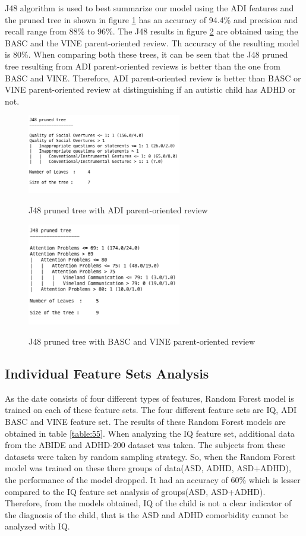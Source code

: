 J48 algorithm is used to best summarize our model using the ADI features and the pruned tree in shown in figure \ref{fig:51} has an accuracy of 94.4\% and precision and recall range from 88\% to 96\%. The J48 results in figure \ref{fig:52} are obtained using the BASC and the VINE parent-oriented review. Th accuracy of the resulting model is 80\%. When comparing both these trees, it can be seen that the J48 pruned tree resulting from ADI parent-oriented reviews is better than the one from BASC and VINE. Therefore, ADI parent-oriented review is better than BASC or VINE parent-oriented review at distinguishing if an autistic child has ADHD or not.
\begin{figure}
\centering
  {\includegraphics[width=0.6\textwidth]{Figures/Figure_5_1.png}}
  \caption{J48 pruned tree with ADI parent-oriented review}
  \label{fig:51}
\end{figure}

\begin{figure}
\centering
  {\includegraphics[width=0.6\textwidth]{Figures/Figure_5_2.png}}
  \caption{J48 pruned tree with BASC and VINE parent-oriented review}
  \label{fig:52}
\end{figure}

\subsection{Individual Feature Sets Analysis}
As the date consists of four different types of features, Random Forest model is trained on each of these feature sets. The four different feature sets are IQ, ADI BASC and VINE feature set. The results of these Random Forest models are obtained in table \ref{table:55}. When analyzing the IQ feature set, additional data from the ABIDE and ADHD-200 dataset was taken. The subjects from these datasets were taken by random sampling strategy. So, when the Random Forest model was trained on these there groups of data(ASD, ADHD, ASD+ADHD), the performance of the model dropped. It had an accuracy of 60\% which is lesser compared to the IQ feature set analysis of groups(ASD, ASD+ADHD). Therefore, from the models obtained, IQ of the child is not a clear indicator of the diagnosis of the child, that is the ASD and ADHD comorbidity cannot be analyzed with IQ.

